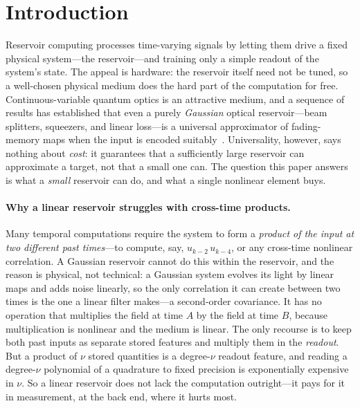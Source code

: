 \documentclass[11pt]{article}
\theoremstyle{remark}
\begin{document}
\tableofcontents
\clearpage

\section{Introduction}
\label{sec:intro}

Reservoir computing processes time-varying signals by letting them drive a fixed
physical system---the reservoir---and training only a simple readout of the
system's state. The appeal is hardware: the reservoir itself need not be tuned, so
a well-chosen physical medium does the hard part of the computation for free.
Continuous-variable quantum optics is an attractive medium, and a sequence of
results has established that even a purely \emph{Gaussian} optical reservoir---beam
splitters, squeezers, and linear loss---is a universal approximator of fading-memory
maps when the input is encoded suitably~\cite{nokkala2021}. Universality, however,
says nothing about \emph{cost}: it guarantees that a sufficiently large reservoir
can approximate a target, not that a small one can. The question this paper answers
is what a \emph{small} reservoir can do, and what a single nonlinear element buys.

\paragraph{Why a linear reservoir struggles with cross-time products.}
Many temporal computations require the system to form a \emph{product of the input
at two different past times}---to compute, say, $u_{k-2}\,u_{k-4}$, or any
cross-time nonlinear correlation. A Gaussian reservoir cannot do this within the
reservoir, and the reason is physical, not technical: a Gaussian system evolves its
light by linear maps and adds noise linearly, so the only correlation it can create
between two times is the one a linear filter makes---a second-order covariance. It
has no operation that multiplies the field at time $A$ by the field at time $B$,
because multiplication is nonlinear and the medium is linear. The only recourse is
to keep both past inputs as separate stored features and multiply them in the
\emph{readout}. But a product of $\nu$ stored quantities is a degree-$\nu$ readout
feature, and reading a degree-$\nu$ polynomial of a quadrature to fixed precision is
exponentially expensive in $\nu$. So a linear reservoir does not lack the
computation outright---it pays for it in measurement, at the back end, where it
hurts most.
\end{document}
